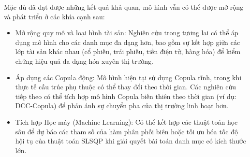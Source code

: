 Mặc dù đã đạt được những kết quả khả quan, mô hình vẫn có thể được mở rộng và phát triển ở các khía cạnh sau:
\begin{itemize}
    \item Mở rộng quy mô và loại hình tài sản: Nghiên cứu trong tương lai có thể áp dụng mô hình cho các danh mục đa dạng hơn, bao gồm sự kết hợp giữa các lớp tài sản khác nhau (cổ phiếu, trái phiếu, tiền điện tử, hàng hóa) để kiểm chứng hiệu quả đa dạng hóa xuyên thị trường.
    \item Áp dụng các Copula động: Mô hình hiện tại sử dụng Copula tĩnh, trong khi thực tế cấu trúc phụ thuộc có thể thay đổi theo thời gian. Các nghiên cứu tiếp theo có thể tích hợp mô hình Copula biến thiên theo thời gian (ví dụ: DCC-Copula) để phản ánh sự chuyển pha của thị trường linh hoạt hơn.
    \item Tích hợp Học máy (Machine Learning): Có thể kết hợp các thuật toán học sâu để dự báo các tham số của hàm phân phối biên hoặc tối ưu hóa tốc độ hội tụ của thuật toán SLSQP khi giải quyết bài toán danh mục có kích thước lớn.
\end{itemize}
